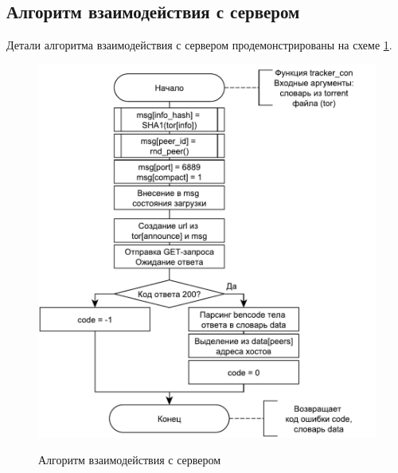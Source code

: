 \subsection{Алгоритм взаимодействия с сервером}
Детали алгоритма взаимодействия с сервером продемонстрированы на схеме \ref{fig201:image}.
\begin{figure}[h]
	\begin{center}
		{\includegraphics[scale = 0.75]{img/server.pdf}}
		\caption{Алгоритм взаимодействия с сервером}
		\label{fig201:image}
	\end{center}
\end{figure}

\newpage

